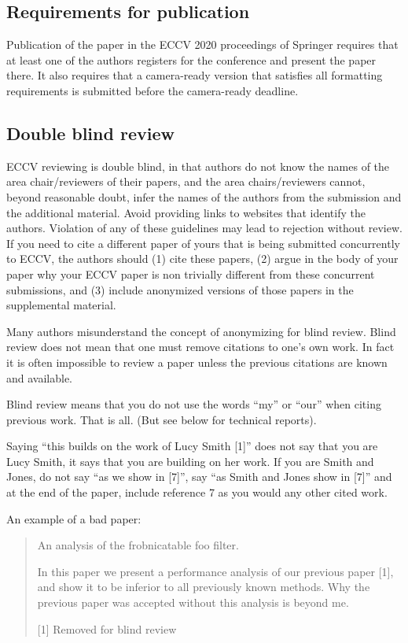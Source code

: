 \documentclass[runningheads]{llncs}
\begin{document}
\subsection{Requirements for publication}
Publication of the paper in the ECCV 2020 proceedings of Springer requires that at least one of the authors registers for the conference and present the paper there. It also requires that a camera-ready version that satisfies all formatting requirements is submitted before the camera-ready deadline. 
\subsection{Double blind review}
\label{sec:blind}
ECCV reviewing is double blind, in that authors do not know the names of the area chair/reviewers of their papers, and the area chairs/reviewers cannot, beyond reasonable doubt, infer the names of the authors from the submission and the additional material. Avoid providing links to websites that identify the authors. Violation of any of these guidelines may lead to rejection without review. If you need to cite a different paper of yours that is being submitted concurrently to ECCV, the authors should (1) cite these papers, (2) argue in the body of your paper why your ECCV paper is non trivially different from these concurrent submissions, and (3) include anonymized versions of those papers in the supplemental material.

Many authors misunderstand the concept of anonymizing for blind
review. Blind review does not mean that one must remove
citations to one's own work. In fact it is often impossible to
review a paper unless the previous citations are known and
available.

Blind review means that you do not use the words ``my'' or ``our''
when citing previous work.  That is all.  (But see below for
technical reports).

Saying ``this builds on the work of Lucy Smith [1]'' does not say
that you are Lucy Smith, it says that you are building on her
work.  If you are Smith and Jones, do not say ``as we show in
[7]'', say ``as Smith and Jones show in [7]'' and at the end of the
paper, include reference 7 as you would any other cited work.

An example of a bad paper:
\begin{quote}
\begin{center}
    An analysis of the frobnicatable foo filter.
\end{center}

   In this paper we present a performance analysis of our
   previous paper [1], and show it to be inferior to all
   previously known methods.  Why the previous paper was
   accepted without this analysis is beyond me.

   [1] Removed for blind review
\end{quote}
\end{document}
